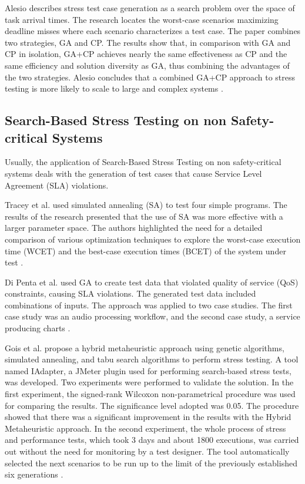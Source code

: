 \documentclass[espaco=umemeio,chapter=TITLE,twoside,openright]{abnt}
\begin{document}
Alesio describes stress test case generation as a search problem over the space of task arrival times. The research locates the worst-case scenarios maximizing deadline misses where each scenario characterizes a test case. The paper combines two strategies, GA and CP. The results show that, in comparison with GA and CP in isolation, GA+CP achieves nearly the same effectiveness as CP and the same efficiency and solution diversity as GA, thus combining the advantages of the two strategies. Alesio concludes that a combined GA+CP approach to stress testing is more likely to scale to large and complex systems \cite{Alesio2015}.

\subsection{Search-Based Stress Testing on non Safety-critical Systems}

Usually, the application of Search-Based Stress Testing on non safety-critical systems deals with the generation of test cases that cause Service Level Agreement (SLA) violations.


Tracey et al. \cite{Tracey1998} used simulated annealing (SA) to test four
simple programs. The results of the research presented that the use of SA was more effective with a larger parameter space. The authors highlighted the need for a detailed comparison of various optimization techniques to explore the worst-case execution time (WCET) and the best-case execution times (BCET) of the system under test \cite{Tracey1998}.

Di Penta et al. \cite{Penta2007} used GA to create test data that violated quality of service (QoS) constraints, causing SLA violations. The generated test data included combinations of inputs. The approach was applied to two case studies. The first case study was an audio processing workflow, and the second case study, a service producing charts \cite{Penta2007}.

Gois et al. propose a hybrid metaheuristic approach using genetic algorithms, simulated annealing, and tabu search algorithms to perform stress testing. A tool named IAdapter, a JMeter plugin used for performing search-based stress tests, was developed. Two experiments were performed to validate the solution. In the first experiment, the signed-rank Wilcoxon non-parametrical procedure was used for comparing the results. The significance level adopted was 0.05. The procedure showed that there was a significant improvement in the results with the Hybrid Metaheuristic approach.
In the second experiment, the whole process of stress and performance tests, which took 3 days and about 1800 executions, was carried out without the need for monitoring by a test designer. The tool automatically selected the next scenarios to be run up to the limit of the previously established six generations \cite{Gois2016}.
\end{document}
